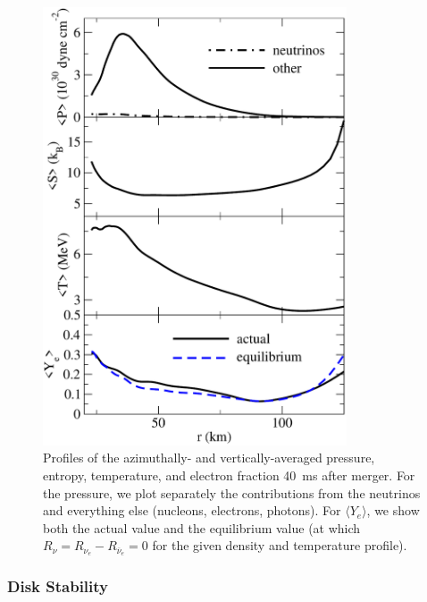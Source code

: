 \begin{figure}
\centering
\includegraphics[width=9cm]{Figures/profiles}
\caption[Radial profiles of disk thermodynamics]{
Profiles of the azimuthally- and vertically-averaged pressure, entropy, temperature, and
electron fraction 40~ms after merger. For the pressure, we plot separately
the contributions from the neutrinos and everything else (nucleons,
electrons, photons).  For $\langle Y_e \rangle$, we show both the actual value and the
equilibrium value (at which $R_{\nu}=R_{\nu_e}-R_{\overline{\nu}_e}=0$ for the
given density and temperature profile).
}
\label{fig:profiles}
\end{figure}

\subsubsection{Disk Stability}

